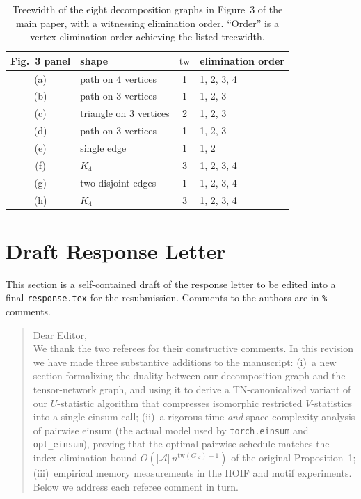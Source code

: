 \documentclass[11pt]{article}
\newcommand{\calA}{\mathcal{A}}
\newcommand{\tw}{\mathrm{tw}}
\theoremstyle{plain}
\theoremstyle{definition}
\begin{document}
\begin{table}[h]
\centering
\caption{Treewidth of the eight decomposition graphs in Figure~3 of the
main paper, with a witnessing elimination order.  ``Order'' is a
vertex-elimination order achieving the listed treewidth.}
\begin{tabular}{clcl}
\toprule
Fig.~3 panel & shape & $\tw$ & elimination order \\
\midrule
(a)  & path  on 4 vertices    & 1 & 1, 2, 3, 4 \\
(b)  & path  on 3 vertices    & 1 & 1, 2, 3    \\
(c)  & triangle on 3 vertices & 2 & 1, 2, 3    \\
(d)  & path on 3 vertices     & 1 & 1, 2, 3    \\
(e)  & single edge             & 1 & 1, 2       \\
(f)  & $K_4$                   & 3 & 1, 2, 3, 4 \\
(g)  & two disjoint edges      & 1 & 1, 2, 3, 4 \\
(h)  & $K_4$                   & 3 & 1, 2, 3, 4 \\
\bottomrule
\end{tabular}
\end{table}

\section{Draft Response Letter}
\label{sec:response}

This section is a self-contained draft of the response letter to be edited
into a final \texttt{response.tex} for the resubmission.  Comments to the
authors are in \texttt{\%}-comments.

\begin{quote}
\noindent
Dear Editor,\\
We thank the two referees for their constructive comments.  In this
revision we have made three substantive additions to the manuscript:
(i)~a new section formalizing the duality between our decomposition graph
and the tensor-network graph, and using it to derive a TN-canonicalized
variant of our $U$-statistic algorithm that compresses isomorphic
restricted $V$-statistics into a single einsum call;
(ii)~a rigorous time \emph{and} space complexity analysis of pairwise
einsum (the actual model used by \texttt{torch.einsum} and
\texttt{opt\_einsum}), proving that the optimal pairwise schedule
matches the index-elimination bound $O(|\calA|\,n^{\tw(G_\calA)+1})$ of
the original Proposition~1;
(iii)~empirical memory measurements in the HOIF and motif experiments.
Below we address each referee comment in turn.\\
\end{quote}
\end{document}
